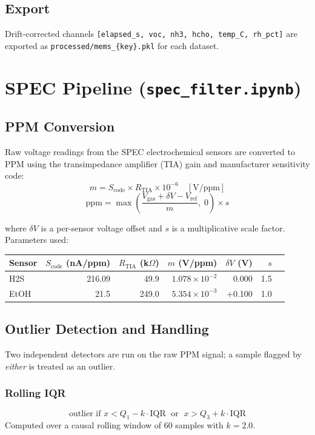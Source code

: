 \documentclass[11pt,a4paper]{article}
\begin{document}
\subsection{Export}

Drift-corrected channels \texttt{[elapsed\_s, voc, nh3, hcho, temp\_C, rh\_pct]}
are exported as \texttt{processed/mems\_\{key\}.pkl} for each dataset.

\section{SPEC Pipeline (\texttt{spec\_filter.ipynb})}

\subsection{PPM Conversion}

Raw voltage readings from the SPEC electrochemical sensors are converted to PPM
using the transimpedance amplifier (TIA) gain and manufacturer sensitivity code:
\[
  m = S_{\text{code}} \times R_{\text{TIA}} \times 10^{-6} \quad [\text{V/ppm}]
\]
\[
  \text{ppm} = \max\!\left(\frac{V_{\text{gas}} + \delta V - V_{\text{ref}}}{m},\; 0\right) \times s
\]

where $\delta V$ is a per-sensor voltage offset and $s$ is a multiplicative
scale factor.  Parameters used:

\begin{center}
\begin{tabular}{lrrrrrr}
\toprule
Sensor & $S_{\text{code}}$ (nA/ppm) & $R_{\text{TIA}}$ (k$\Omega$) & $m$ (V/ppm) & $\delta V$ (V) & $s$ \\
\midrule
H2S  & 216.09 & 49.9  & $1.078 \times 10^{-2}$ & 0.000 & 1.5 \\
EtOH &  21.5  & 249.0 & $5.354 \times 10^{-3}$ & +0.100 & 1.0 \\
\bottomrule
\end{tabular}
\end{center}

\subsection{Outlier Detection and Handling}

Two independent detectors are run on the raw PPM signal; a sample flagged by
\emph{either} is treated as an outlier.

\subsubsection*{Rolling IQR}
\[
  \text{outlier if } x < Q_1 - k \cdot \text{IQR} \;\text{ or }\; x > Q_3 + k \cdot \text{IQR}
\]
Computed over a causal rolling window of 60 samples with $k = 2.0$.
\end{document}
